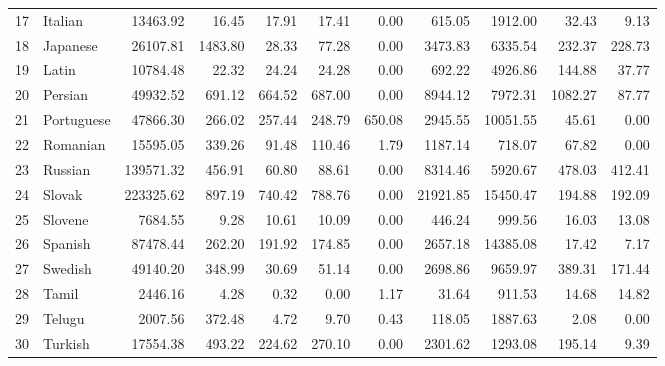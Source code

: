 \documentclass[a4paper]{article}
\begin{document}
\begin{table}
\begin{tabular}{rlrrrrrrrrr}
  17 & Italian & 13463.92 & 16.45 & 17.91 & 17.41 & 0.00 & 615.05 & 1912.00 & 32.43 & 9.13 \\ 
  18 & Japanese & 26107.81 & 1483.80 & 28.33 & 77.28 & 0.00 & 3473.83 & 6335.54 & 232.37 & 228.73 \\ 
  19 & Latin & 10784.48 & 22.32 & 24.24 & 24.28 & 0.00 & 692.22 & 4926.86 & 144.88 & 37.77 \\ 
  20 & Persian & 49932.52 & 691.12 & 664.52 & 687.00 & 0.00 & 8944.12 & 7972.31 & 1082.27 & 87.77 \\ 
  21 & Portuguese & 47866.30 & 266.02 & 257.44 & 248.79 & 650.08 & 2945.55 & 10051.55 & 45.61 & 0.00 \\ 
  22 & Romanian & 15595.05 & 339.26 & 91.48 & 110.46 & 1.79 & 1187.14 & 718.07 & 67.82 & 0.00 \\ 
  23 & Russian & 139571.32 & 456.91 & 60.80 & 88.61 & 0.00 & 8314.46 & 5920.67 & 478.03 & 412.41 \\ 
  24 & Slovak & 223325.62 & 897.19 & 740.42 & 788.76 & 0.00 & 21921.85 & 15450.47 & 194.88 & 192.09 \\ 
  25 & Slovene & 7684.55 & 9.28 & 10.61 & 10.09 & 0.00 & 446.24 & 999.56 & 16.03 & 13.08 \\ 
  26 & Spanish & 87478.44 & 262.20 & 191.92 & 174.85 & 0.00 & 2657.18 & 14385.08 & 17.42 & 7.17 \\ 
  27 & Swedish & 49140.20 & 348.99 & 30.69 & 51.14 & 0.00 & 2698.86 & 9659.97 & 389.31 & 171.44 \\ 
  28 & Tamil & 2446.16 & 4.28 & 0.32 & 0.00 & 1.17 & 31.64 & 911.53 & 14.68 & 14.82 \\ 
  29 & Telugu & 2007.56 & 372.48 & 4.72 & 9.70 & 0.43 & 118.05 & 1887.63 & 2.08 & 0.00 \\ 
  30 & Turkish & 17554.38 & 493.22 & 224.62 & 270.10 & 0.00 & 2301.62 & 1293.08 & 195.14 & 9.39 \\ 
   \hline
\end{tabular}
\end{table}
\pagestyle{plain}
\end{document}
